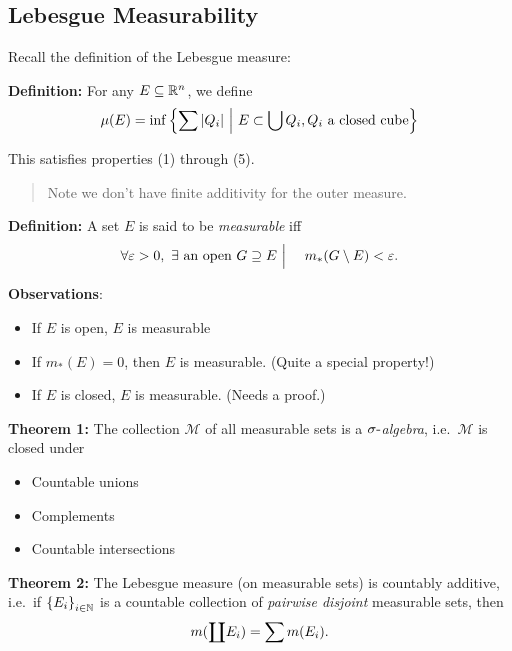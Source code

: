 \hypertarget{lebesgue-measurability}{%
\subsection{Lebesgue Measurability}\label{lebesgue-measurability}}

Recall the definition of the Lebesgue measure:

\textbf{Definition:} For any \(E \subseteq {\mathbb{R}}^n\), we define
\begin{align*}
\mu(E) = \inf \left\{{\sum {\left\lvert {Q_i} \right\rvert} {~\mathrel{\Big|}~} E \subset \bigcup Q_i, Q_i ~\text{a closed cube}}\right\}
\end{align*}

This satisfies properties (1) through (5).

\begin{quote}
Note we don't have finite additivity for the outer measure.
\end{quote}

\textbf{Definition:} A set \(E\) is said to be \emph{measurable} iff
\begin{align*}
\forall\varepsilon > 0, ~\exists \text{ an open }G \supseteq E  {~\mathrel{\Big|}~}\quad m_*(G\setminus E) < \varepsilon.
\end{align*}

\textbf{Observations}:

\begin{itemize}
\item
  If \(E\) is open, \(E\) is measurable
\item
  If \(m_*(E) = 0\), then \(E\) is measurable. (Quite a special
  property!)
\item
  If \(E\) is closed, \(E\) is measurable. (Needs a proof.)
\end{itemize}

\textbf{Theorem 1:} The collection \(\mathcal M\) of all measurable sets
is a \emph{\(\sigma{\hbox{-}}\)algebra}, i.e.~\(\mathcal M\) is closed under

\begin{itemize}
\item
  Countable unions
\item
  Complements
\item
  Countable intersections
\end{itemize}

\textbf{Theorem 2:} The Lebesgue measure (on measurable sets) is
countably additive, i.e.~if \(\left\{{E_i}\right\}_{i\in{\mathbb{N}}}\) is a countable
collection of \emph{pairwise disjoint} measurable sets, then
\begin{align*}
m({\coprod} E_i) = \sum m(E_i).
\end{align*}

